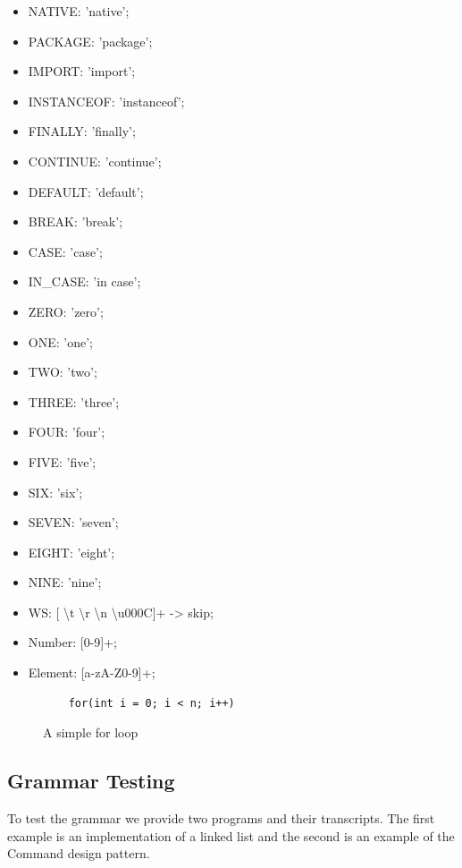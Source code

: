 \begin{itemize}
	\item NATIVE: 'native';
	\item PACKAGE: 'package';
	\item IMPORT: 'import';
	\item INSTANCEOF: 'instanceof';
	\item FINALLY: 'finally';
	\item CONTINUE: 'continue';
	\item DEFAULT: 'default';
	\item BREAK: 'break';
	\item CASE: 'case';
	\item IN\_CASE: 'in case';
	\item ZERO: 'zero';
	\item ONE: 'one';
	\item TWO: 'two';
	\item THREE: 'three';
	\item FOUR: 'four';
	\item FIVE: 'five';
	\item SIX: 'six';
	\item SEVEN: 'seven';
	\item EIGHT: 'eight';
	\item NINE: 'nine';
	\item WS: [ \textbackslash t \textbackslash r \textbackslash n \textbackslash u000C]+ -> skip;
	\item Number: [0-9]+;
	\item Element: [a-zA-Z0-9\-]+;
\end{itemize}

\begin{figure}[H]
	\begin{lstlisting}
	for(int i = 0; i < n; i++)
	\end{lstlisting}
	\caption{A simple for loop}
	\label{fig20}
\end{figure}

\subsection{Grammar Testing} \label{subsection: Grammar Testing}
To test the grammar we provide two programs and their transcripts. The first example is an implementation of a linked list and the second is an example of the Command design pattern. 
